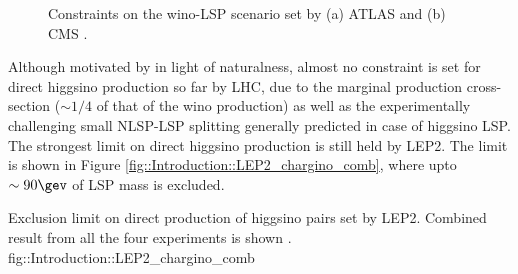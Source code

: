 \begin{figure}
  \centering
    \caption{Constraints on the wino-LSP scenario set by (a) ATLAS \cite{ATLAS_SUSY_LLDT} and (b) CMS \cite{CMS_SUSY_LLDT_Run1}.}
    \label{fig::Introduction::LHCLimitWino}
\end{figure}
Although motivated by in light of naturalness, 
almost no constraint is set for direct higgsino production so far by LHC, 
due to the marginal production cross-section ($\sim 1/4$ of that of the wino production) as well as the experimentally challenging small NLSP-LSP splitting generally predicted in case of higgsino LSP.
The strongest limit on direct higgsino production is still held by LEP2.
The limit is shown in Figure \ref{fig::Introduction::LEP2_chargino_comb}, where upto $\sim 90\gev$ of LSP mass is excluded.

{Exclusion limit on direct production of higgsino pairs set by LEP2. Combined result from all the four experiments is shown \cite{LEP2LowDMChargino}.} 
{fig::Introduction::LEP2_chargino_comb}








